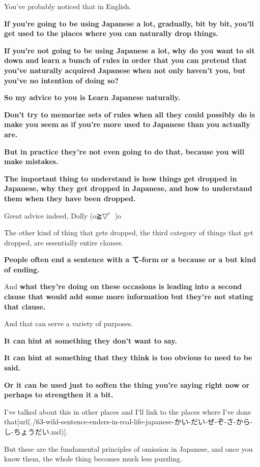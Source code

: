 You've probably noticed that in English.

{\bf If you're going to be using Japanese a lot, gradually, bit by bit,} {\bf you'll get used to the places where you can naturally drop things.}

{\bf If you're not going to be using Japanese a lot,} {\bf why do you want to sit down and learn a bunch of rules} {\bf in order that you can pretend that you've naturally acquired Japanese} {\bf when not only haven't you, but you've no intention of doing so?}

\thinrule

{\bf So my advice to you is Learn Japanese naturally.}

{\bf Don't try to memorize sets of rules when all they could possibly do is make you seem} {\bf as if you're more used to Japanese than you actually are.}

{\bf But in practice they're not even going to do that, because you will make mistakes.}

{\bf The important thing to understand is how things get dropped in Japanese,} {\bf why they get dropped in Japanese, and} {\bf how to understand them when they have been dropped.}

Great advice indeed, Dolly (o≧▽゜)o

\stopsectionlevel

\startsectionlevel[title={Dropping entire clauses},reference={dropping-entire-clauses}]

The other kind of thing that gets dropped, the third category of things that get dropped, are essentially entire clauses.

{}

{\bf People often end a sentence with a て-form} {\bf or a because or a but kind of ending.}

\thinrule

And {\bf what they're doing on these occasions is leading} {\bf into a second clause that would add some more information} {\bf but they're not stating that clause.}

And that can serve a variety of purposes.

{\bf It can hint at something they don't want to say.}

{\bf It can hint at something that they think is too obvious to need to be said.}

{\bf Or it can be used just to soften the thing you're saying right now} {\bf or perhaps to strengthen it a bit.}

I've talked about this in other places and I'll link to the places where I've done that\goto{{[}63{]}}[url(./63-wild-sentence-enders-in-real-life-japanese-かい-だい-ぜ-ぞ-さ-から-し-ちょうだい.md)].

But these are the fundamental principles of omission in Japanese, and once you know them, the whole thing becomes much less puzzling.

\stopsectionlevel

\stopsectionlevel

\stopsectionlevel
